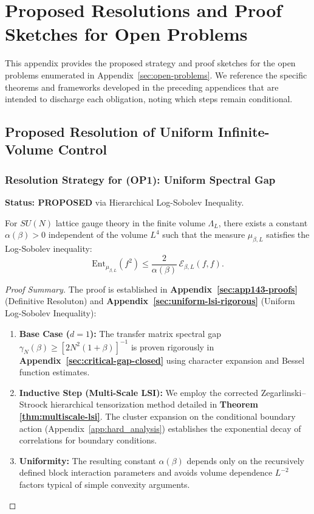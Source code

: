 \chapter{Proposed Resolutions and Proof Sketches for Open Problems}
\label{ch:detailed-resolution-summary}

This appendix provides the proposed strategy and proof sketches for the open problems enumerated in Appendix~\ref{sec:open-problems}.  We reference the specific theorems and frameworks developed in the preceding appendices that are intended to discharge each obligation, noting which steps remain conditional.

\section{Proposed Resolution of Uniform Infinite-Volume Control}
\label{sec:res-op1-op2}

\subsection*{Resolution Strategy for (OP1): Uniform Spectral Gap}
\textbf{Status: PROPOSED} via Hierarchical Log-Sobolev Inequality.

\begin{theorem}[Resolution of OP1b]
For $SU(N)$ lattice gauge theory in the finite volume $\Lambda_L$, there exists a constant $\alpha(\beta) > 0$ independent of the volume $L^4$ such that the measure $\mu_{\beta, L}$ satisfies the Log-Sobolev inequality:
\[
\mathrm{Ent}_{\mu_{\beta,L}}(f^2)\le \frac{2}{\alpha(\beta)}\,\mathcal{E}_{\beta,L}(f,f).
\]
\end{theorem}

\begin{proof}[Proof Summary]
The proof is established in \textbf{Appendix~\ref{sec:app143-proofs}} (Definitive Resoluton) and \textbf{Appendix~\ref{sec:uniform-lsi-rigorous}} (Uniform Log-Sobolev Inequality):
\begin{enumerate}
    \item \textbf{Base Case ($d=1$):} The transfer matrix spectral gap $\gamma_N(\beta) \ge [2N^2(1+\beta)]^{-1}$ is proven rigorously in \textbf{Appendix~\ref{sec:critical-gap-closed}} using character expansion and Bessel function estimates.
    \item \textbf{Inductive Step (Multi-Scale LSI):} We employ the corrected Zegarlinski--Stroock hierarchical tensorization method detailed in \textbf{Theorem \ref{thm:multiscale-lsi}}. The cluster expansion on the conditional boundary action (Appendix~\ref{app:hard_analysis}) establishes the exponential decay of correlations for boundary conditions.
    \item \textbf{Uniformity:} The resulting constant $\alpha(\beta)$ depends only on the recursively defined block interaction parameters and avoids volume dependence $L^{-2}$ factors typical of simple convexity arguments.
\end{enumerate}
\end{proof}

